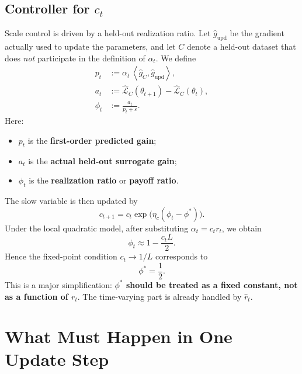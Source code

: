 \documentclass[11pt,a4paper]{article}
\newcommand{\ip}[2]{\left\langle #1,#2 \right\rangle}
\newcommand{\ghat}{\hat g}
\newcommand{\rhat}{\hat r_t}
\newcommand{\phit}{\phi_t}
\begin{document}
\subsection{Controller for $c_t$}
Scale control is driven by a held-out realization ratio. Let $\ghat_{\mathrm{upd}}$ be the gradient actually used to update the parameters, and let $C$ denote a held-out dataset that does \emph{not} participate in the definition of $\alpha_t$. We define
\begin{align}
 p_t &:= \alpha_t \, \ip{\ghat_C}{\ghat_{\mathrm{upd}}}, \\
 a_t &:= \widehat{\mathcal L}_C(\theta_{t+1}) - \widehat{\mathcal L}_C(\theta_t), \\
 \phit &:= \frac{a_t}{p_t + \varepsilon}.
\end{align}
Here:
\begin{itemize}[leftmargin=2em]
    \item $p_t$ is the \textbf{first-order predicted gain};
    \item $a_t$ is the \textbf{actual held-out surrogate gain};
    \item $\phit$ is the \textbf{realization ratio} or \textbf{payoff ratio}.
\end{itemize}
The slow variable is then updated by
\begin{equation}
 c_{t+1} = c_t \exp\!\bigl(\eta_c(\phit - \phi^{\ast})\bigr).
\end{equation}
Under the local quadratic model, after substituting $\alpha_t = c_t r_t$, we obtain
\begin{equation}
\phit \approx 1 - \frac{c_t L}{2}.
\end{equation}
Hence the fixed-point condition $c_t \to 1/L$ corresponds to
\begin{equation}
\phi^{\ast} = \frac{1}{2}.
\end{equation}
This is a major simplification: \textbf{$\phi^{\ast}$ should be treated as a fixed constant, not as a function of $r_t$}. The time-varying part is already handled by $\rhat$.

\section{What Must Happen in One Update Step}
\end{document}
